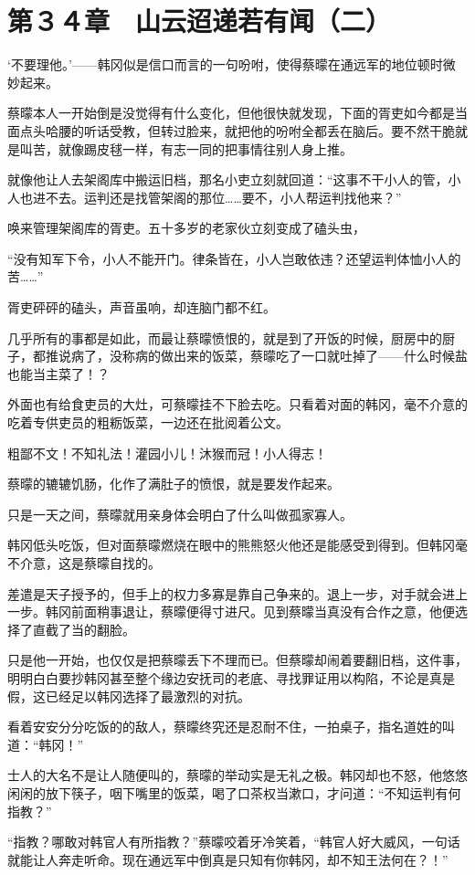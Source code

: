 \section{第３４章　山云迢递若有闻（二）}

‘不要理他。’——韩冈似是信口而言的一句吩咐，使得蔡曚在通远军的地位顿时微妙起来。

蔡曚本人一开始倒是没觉得有什么变化，但他很快就发现，下面的胥吏如今都是当面点头哈腰的听话受教，但转过脸来，就把他的吩咐全都丢在脑后。要不然干脆就是叫苦，就像踢皮毬一样，有志一同的把事情往别人身上推。

就像他让人去架阁库中搬运旧档，那名小吏立刻就回道：“这事不干小人的管，小人也进不去。运判还是找管架阁的那位……要不，小人帮运判找他来？”

唤来管理架阁库的胥吏。五十多岁的老家伙立刻变成了磕头虫，

“没有知军下令，小人不能开门。律条皆在，小人岂敢依违？还望运判体恤小人的苦……”

胥吏砰砰的磕头，声音虽响，却连脑门都不红。

几乎所有的事都是如此，而最让蔡曚愤恨的，就是到了开饭的时候，厨房中的厨子，都推说病了，没称病的做出来的饭菜，蔡曚吃了一口就吐掉了——什么时候盐也能当主菜了！？

外面也有给食吏员的大灶，可蔡曚挂不下脸去吃。只看着对面的韩冈，毫不介意的吃着专供吏员的粗粝饭菜，一边还在批阅着公文。

粗鄙不文！不知礼法！灌园小儿！沐猴而冠！小人得志！

蔡曚的辘辘饥肠，化作了满肚子的愤恨，就是要发作起来。

只是一天之间，蔡曚就用亲身体会明白了什么叫做孤家寡人。

韩冈低头吃饭，但对面蔡曚燃烧在眼中的熊熊怒火他还是能感受到得到。但韩冈毫不介意，这是蔡曚自找的。

差遣是天子授予的，但手上的权力多寡是靠自己争来的。退上一步，对手就会进上一步。韩冈前面稍事退让，蔡曚便得寸进尺。见到蔡曚当真没有合作之意，他便选择了直截了当的翻脸。

只是他一开始，也仅仅是把蔡曚丢下不理而已。但蔡曚却闹着要翻旧档，这件事，明明白白要抄韩冈甚至整个缘边安抚司的老底、寻找罪证用以构陷，不论是真是假，这已经足以韩冈选择了最激烈的对抗。

看着安安分分吃饭的的敌人，蔡曚终究还是忍耐不住，一拍桌子，指名道姓的叫道：“韩冈！”

士人的大名不是让人随便叫的，蔡曚的举动实是无礼之极。韩冈却也不怒，他悠悠闲闲的放下筷子，咽下嘴里的饭菜，喝了口茶权当漱口，才问道：“不知运判有何指教？”

“指教？哪敢对韩官人有所指教？”蔡曚咬着牙冷笑着，“韩官人好大威风，一句话就能让人奔走听命。现在通远军中倒真是只知有你韩冈，却不知王法何在？！”

